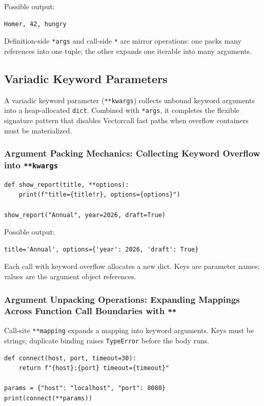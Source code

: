 \documentclass[a4paper,twoside]{report}
\begin{document}
Possible output:

\begin{verbatim}
Homer, 42, hungry
\end{verbatim}

Definition-side \texttt{*args} and call-side \texttt{*} are mirror operations: one packs many references into one tuple; the other expands one iterable into many arguments.


\subsection{Variadic Keyword Parameters}

A variadic keyword parameter (\texttt{**kwargs}) collects unbound keyword arguments into a heap-allocated \texttt{dict}. Combined with \texttt{*args}, it completes the flexible signature pattern that disables Vectorcall fast paths when overflow containers must be materialized.

\subsubsection{Argument Packing Mechanics: Collecting Keyword Overflow into \texttt{**kwargs}}

\begin{verbatim}
def show_report(title, **options):
    print(f"title={title!r}, options={options}")

show_report("Annual", year=2026, draft=True)
\end{verbatim}

Possible output:

\begin{verbatim}
title='Annual', options={'year': 2026, 'draft': True}
\end{verbatim}

Each call with keyword overflow allocates a new dict. Keys are parameter names; values are the argument object references.

\subsubsection{Argument Unpacking Operations: Expanding Mappings Across Function Call Boundaries with \texttt{**}}

Call-site \texttt{**mapping} expands a mapping into keyword arguments. Keys must be strings; duplicate binding raises \texttt{TypeError} before the body runs.

\begin{verbatim}
def connect(host, port, timeout=30):
    return f"{host}:{port} timeout={timeout}"

params = {"host": "localhost", "port": 8080}
print(connect(**params))
\end{verbatim}
\end{document}
